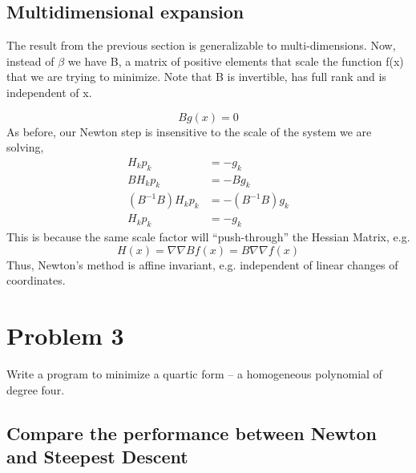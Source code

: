 \documentclass{article}
\begin{document}
\subsection{Multidimensional expansion}

The result from the previous section is generalizable to
multi-dimensions. Now, instead of $\beta$ we have B, a matrix of
positive elements that scale the function f(x) that we are trying to
minimize. Note that B is invertible, has full rank and is independent of
x. 

\begin{equation}
 Bg(x) = 0
\end{equation}
As before, our Newton step is insensitive to the scale of the system we
are solving, 
\begin{align*}
 H_{k} p_{k}&=-g_{k}\\
 B H_{k} p_{k}&=- B g_{k}\\
 (B^{-1}B)H_{k} p_{k}&=-(B^{-1}B)g_{k} \\
 H_{k} p_{k}&=-g_{k}
\end{align*}
This is because the same scale factor will ``push-through'' the Hessian
Matrix, e.g. 
\begin{equation}
H(x) = \nabla\nabla B f(x) = B \nabla\nabla f(x) 
\end{equation}
Thus, Newton's method is affine invariant, e.g. independent of linear
changes of coordinates. 

\section{Problem 3}

Write a program to minimize a quartic form -- a homogeneous polynomial
of degree four. 
\newpage
\subsection{Compare the performance between Newton and Steepest Descent}
\end{document}
